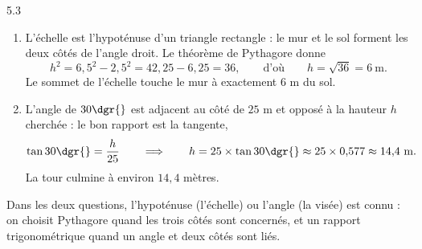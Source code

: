 \begin{corrige}{5.3}
\begin{enumerate}
\item L'échelle est l'hypoténuse d'un triangle rectangle : le mur et le sol forment les deux côtés de l'angle droit. Le théorème de Pythagore donne
\[
h^{2} = 6{,}5^{2} - 2{,}5^{2} = 42{,}25 - 6{,}25 = 36 ,
\qquad\text{d'où}\qquad
h = \sqrt{36} = 6 \ \text{m} .
\]
Le sommet de l'échelle touche le mur à exactement $6$ m du sol.
\item L'angle de $30\dgr{}$ est adjacent au côté de $25$ m et opposé à la hauteur $h$ cherchée : le bon rapport est la tangente,
\[
\tan 30\dgr{} = \frac{h}{25}
\qquad\Longrightarrow\qquad
h = 25 \times \tan 30\dgr{} \approx 25 \times 0{,}577 \approx 14{,}4 \ \text{m} .
\]
La tour culmine à environ $14{,}4$ mètres.
\end{enumerate}
Dans les deux questions, l'hypoténuse (l'échelle) ou l'angle (la visée) est connu : on choisit Pythagore quand les trois côtés sont concernés, et un rapport trigonométrique quand un angle et deux côtés sont liés.
\end{corrige}

